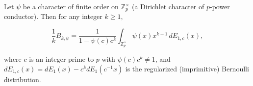 Let $\psi$ be a character of finite order on $\mathbb{Z}_p^\times$ (a Dirichlet character
of $p$-power conductor). Then for any integer $k \geq 1$,

$$\frac{1}{k} B_{k,\psi} = \frac{1}{1 - \psi(c) c^k} \int_{\mathbb{Z}_p^\times} \psi(x) x^{k-1} \, dE_{1,c}(x),$$

where $c$ is an integer prime to $p$ with $\psi(c) c^k \neq 1$, and
$dE_{1,c}(x) = dE_1(x) - c^k dE_1(c^{-1}x)$ is the regularized (imprimitive)
Bernoulli distribution.
